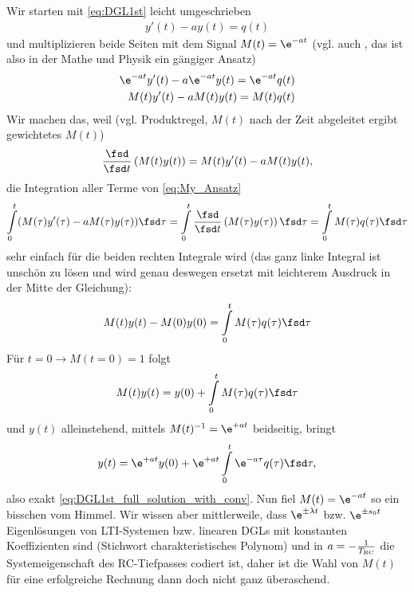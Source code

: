 Wir starten mit \eqref{eq:DGL1st} leicht umgeschrieben
\begin{align}
y'(t) - a y(t) = q(t)
\end{align}
und multiplizieren beide Seiten mit dem Signal $M(t) = \e^{-a t}$ (vgl. auch \cite[Kap. 7.2, S. 336]{Arfken2013}, das ist also in der Mathe und Physik ein gängiger Ansatz)
\begin{align}
\e^{-a t} y'(t) - a \e^{-a t} y(t) = \e^{-a t} q(t)\\
M(t) y'(t) - a M(t) y(t) = M(t) q(t)
\label{eq:My_Ansatz}
\end{align}
Wir machen das, weil (vgl. Produktregel, $M(t)$ nach der Zeit abgeleitet ergibt gewichtetes $M(t)$)
\begin{align}
\frac{\fsd}{\fsd t}\left(M(t) y(t)\right) = M(t) y'(t) - a M(t) y(t),
\end{align}
die Integration aller Terme von \eqref{eq:My_Ansatz}
\begin{align}
\int\limits_{0}^{t} (M(\tau) y'(\tau) - a M(\tau) y(\tau)) \fsd \tau =
\int\limits_{0}^{t} \frac{\fsd}{\fsd t}\left(M(\tau) y(\tau)\right) \fsd \tau = \int\limits_{0}^{t} M(\tau) q(\tau) \fsd\tau
\end{align}
sehr einfach für die beiden rechten Integrale wird (das ganz linke Integral ist unschön zu lösen und wird genau deswegen ersetzt mit leichterem Ausdruck in der Mitte der Gleichung):
\begin{align}
M(t) y(t) - M(0)y(0) = \int\limits_{0}^{t} M(\tau) q(\tau) \fsd\tau
\end{align}
Für $t=0 \rightarrow M(t=0)=1$ folgt
\begin{align}
M(t) y(t) = y(0) + \int\limits_{0}^{t} M(\tau) q(\tau) \fsd\tau
\end{align}
und $y(t)$ alleinstehend, mittels $M(t)^{-1} = \e^{+a t}$ beidseitig, bringt
\begin{align}
y(t) = \e^{+a t} y(0) + \e^{+a t} \int\limits_{0}^{t} \e^{-a \tau} q(\tau) \fsd\tau,
\end{align}
also exakt \eqref{eq:DGL1st_full_solution_with_conv}. Nun fiel $M(t) = \e^{-a t}$ so ein bisschen vom Himmel. Wir wissen aber mittlerweile, dass $\e^{\pm \lambda t}$
bzw. $\e^{\pm s_0 t}$ Eigenlösungen von LTI-Systemen bzw. linearen DGLs mit konstanten Koeffizienten sind (Stichwort charakteristisches Polynom) und in $a=-\frac{1}{T_\text{RC}}$ die Systemeigenschaft des RC-Tiefpasses codiert ist, daher ist die Wahl von $M(t)$ für eine erfolgreiche Rechnung dann doch nicht ganz überaschend.

